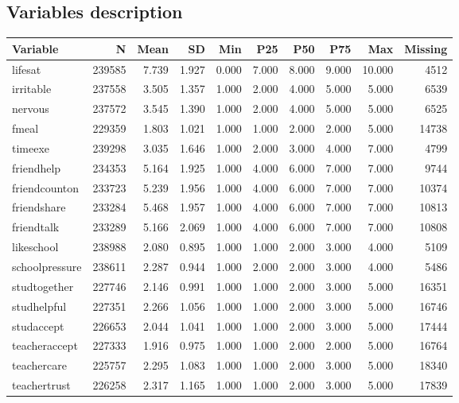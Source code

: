 \documentclass[a4paper]{article}
\begin{document}
\begin{appendices}
\section{Variables description}
\label{appendix:missing_values_table}
\begin{table}[htbp]

\centering
\tiny{
\begin{tabular}{lrrrrrrrrr} 
\scriptsize

Variable & N & Mean & SD & Min & P25 & P50 & P75 & Max & Missing \\
\midrule
lifesat & 239585 & 7.739& 1.927& 0.000& 7.000& 8.000& 9.000& 10.000& 4512 \\
irritable & 237558 & 3.505& 1.357& 1.000& 2.000& 4.000& 5.000& 5.000& 6539 \\
nervous & 237572 & 3.545& 1.390& 1.000& 2.000& 4.000& 5.000& 5.000& 6525 \\
fmeal & 229359 & 1.803& 1.021& 1.000& 1.000& 2.000& 2.000& 5.000& 14738 \\
timeexe & 239298 & 3.035& 1.646& 1.000& 2.000& 3.000& 4.000& 7.000& 4799 \\
friendhelp & 234353 & 5.164& 1.925& 1.000& 4.000& 6.000& 7.000& 7.000& 9744 \\
friendcounton & 233723 & 5.239& 1.956& 1.000& 4.000& 6.000& 7.000& 7.000& 10374 \\
friendshare & 233284 & 5.468& 1.957& 1.000& 4.000& 6.000& 7.000& 7.000& 10813 \\
friendtalk & 233289 & 5.166& 2.069& 1.000& 4.000& 6.000& 7.000& 7.000& 10808 \\
likeschool & 238988 & 2.080& 0.895& 1.000& 1.000& 2.000& 3.000& 4.000& 5109 \\
schoolpressure & 238611 & 2.287& 0.944& 1.000& 2.000& 2.000& 3.000& 4.000& 5486 \\
studtogether & 227746 & 2.146& 0.991& 1.000& 1.000& 2.000& 3.000& 5.000& 16351 \\
studhelpful & 227351 & 2.266& 1.056& 1.000& 1.000& 2.000& 3.000& 5.000& 16746 \\
studaccept & 226653 & 2.044& 1.041& 1.000& 1.000& 2.000& 3.000& 5.000& 17444 \\
teacheraccept & 227333 & 1.916& 0.975& 1.000& 1.000& 2.000& 2.000& 5.000& 16764 \\
teachercare & 225757 & 2.295& 1.083& 1.000& 1.000& 2.000& 3.000& 5.000& 18340 \\
teachertrust & 226258 & 2.317& 1.165& 1.000& 1.000& 2.000& 3.000& 5.000& 17839 \\

\end{tabular}}
\end{table}
\end{appendices}
\end{document}
